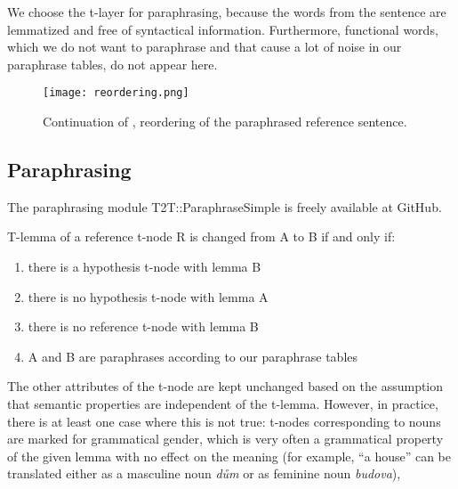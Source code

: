 We choose the t-layer for paraphrasing, because the words from the sentence 
are lemmatized and free of syntactical information. Furthermore, functional 
words, which we do not want to paraphrase and that cause a lot of noise in our 
paraphrase tables, do not appear here.

\begin{figure*}[tb]
\begin{center}
\texttt{[image: reordering.png]} 
\caption{Continuation of , reordering of the paraphrased reference
sentence.}
\label{reordering}
\end{center}
\end{figure*}

\subsection{Paraphrasing}
The paraphrasing module T2T::ParaphraseSimple 
is freely available at 
GitHub. 

T-lemma of a reference t-node R is changed from A to B if and only if:
\begin{enumerate}
\item there is a hypothesis t-node with lemma B
\item there is no hypothesis t-node with lemma A 
\item there is no reference t-node with lemma B
\item A and B are paraphrases according to our paraphrase tables
\end{enumerate}

The other attributes of the t-node are kept unchanged based on the assumption that
semantic properties are independent of the t-lemma. However, in practice, there 
is at least one case where this is not true: t-nodes corresponding to nouns are 
marked for grammatical %
gender, which is very often a grammatical property of 
the given lemma with no effect on the meaning (for example, ``a house'' can be 
translated either as a masculine noun \textit{dům} or as feminine noun 
\textit{budova}),

